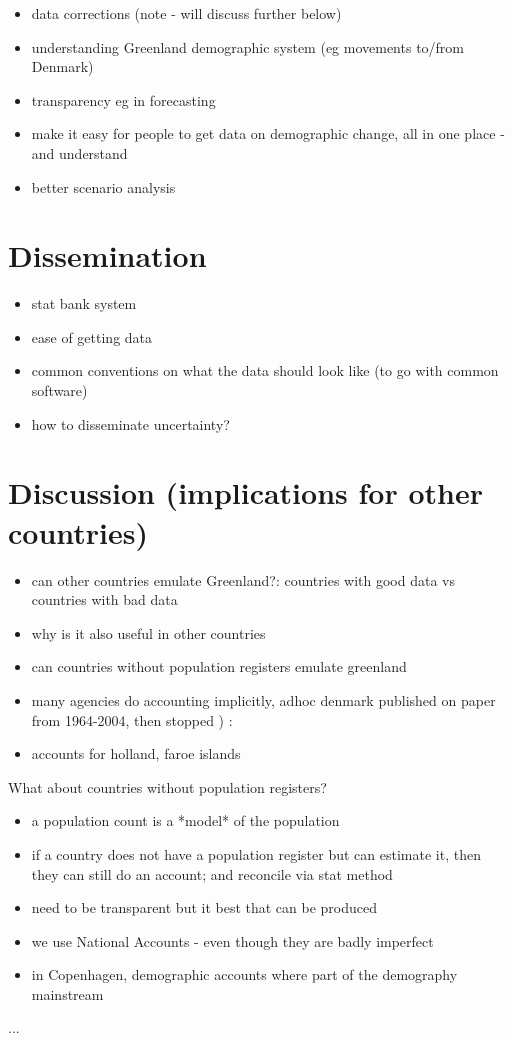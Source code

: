 \documentclass[USenglish]{article}
\begin{document}
\begin{itemize}
    \item data corrections (note - will discuss further below)
    \item understanding Greenland demographic system (eg movements to/from Denmark)
    \item transparency eg in forecasting
    \item make it easy for people to get data on demographic change, all in one place - and understand
    \item better scenario analysis
\end{itemize}



\section{Dissemination}

\begin{itemize}
    \item stat bank system
    \item ease of getting data
    \item common conventions on what the data should look like (to go with common software)
    \item how to disseminate uncertainty?
\end{itemize}

\section{Discussion (implications for other countries)}

\begin{itemize}
    \item can other countries emulate Greenland?: countries with good data vs countries with bad data
    \item why is it also useful in other countries
    \item can countries without population registers emulate greenland
    \item many agencies do accounting implicitly, adhoc
    denmark published on paper from 1964-2004, then stopped ) :
    \item accounts for holland, faroe islands
    
\end{itemize}

What about countries without population registers?
\begin{itemize}
    \item a population count is a *model* of the population
    \item if a country does not have a population register but can estimate it, then they can still do an account; and reconcile via stat method
    \item need to be transparent but it best that can be produced
    \item we use National Accounts - even though they are badly imperfect
    \item in Copenhagen, demographic accounts where part of the demography mainstream
\end{itemize}


\begin{acknowledgement}
  ...
\end{acknowledgement}


{}
\end{document}
